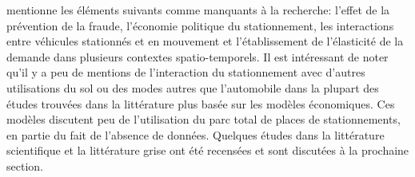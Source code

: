         \textcite{inci_review_2015} mentionne les éléments suivants comme manquants à la recherche: l'effet de la prévention de la fraude, l'économie politique du stationnement, les interactions entre véhicules stationnés et en mouvement et l'établissement de l'élasticité de la demande dans plusieurs contextes spatio-temporels. Il est intéressant de noter qu'il y a peu de mentions de l'interaction du stationnement avec d'autres utilisations du sol ou des modes autres que l'automobile dans la plupart des études trouvées dans la littérature plus basée sur les modèles économiques. Ces modèles discutent peu de l'utilisation du parc total de places de stationnements, en partie du fait de l'absence de données. Quelques études dans la littérature scientifique et la littérature grise ont été recensées et sont discutées à la prochaine section.
    
      
